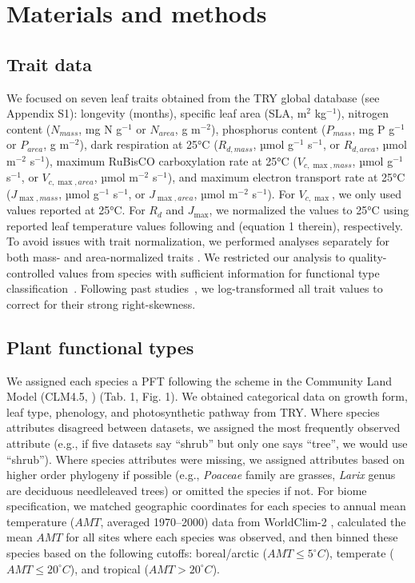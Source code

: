 \documentclass{article}
\begin{document}
\section{Materials and methods}

\subsection{Trait data}

We focused on seven leaf traits obtained from the TRY global database \citep{kattge_2011_try} (see Appendix S1):
longevity (months),
specific leaf area (SLA, m$^2$ kg$^{-1}$),
nitrogen content ($N_{mass}$, mg N g$^{-1}$ or $N_{area}$, g m$^{-2}$),
phosphorus content ($P_{mass}$, mg P g$^{-1}$ or $P_{area}$, g m$^{-2}$),
dark respiration at 25°C ($R_{d,mass}$, µmol g$^{-1}$ s$^{-1}$, or $R_{d,area}$, µmol m$^{-2}$ s$^{-1}$),
maximum RuBisCO carboxylation rate at 25°C ($V_{c,\max,mass}$, µmol g$^{-1}$ s$^{-1}$, or $V_{c,\max,area}$, µmol m$^{-2}$ s$^{-1}$),
and maximum electron transport rate at 25°C ($J_{\max,mass}$, µmol g$^{-1}$ s$^{-1}$, or $J_{\max,area}$, µmol m$^{-2}$ s$^{-1}$).
For $V_{c,\max}$, we only used values reported at 25°C.
For $R_{d}$ and $J_{\max}$, we normalized the values to 25°C using reported leaf temperature values following \citet{atkin_2015_global} and \citet{kattge_2007_temperature} (equation 1 therein), respectively.
To avoid issues with trait normalization, we performed analyses separately for both mass- and area-normalized traits \citep{osnas_2013_global,lloyd_2013_photosynthetically}.
We restricted our analysis to quality-controlled values from species with sufficient information for functional type classification~\cite[see][]{kattge_2011_try}.
Following past studies~\cite[e.g.][]{wright_2004_worldwide,onoda_2011_global,diaz_2015_global}, we log-transformed all trait values to correct for their strong right-skewness.

\subsection{Plant functional types}

We assigned each species a PFT following the scheme in the Community Land Model (CLM4.5, \citealt{clm45_note}) (Tab. 1, Fig. 1).
We obtained categorical data on growth form, leaf type, phenology, and photosynthetic pathway from TRY.
Where species attributes disagreed between datasets, we assigned the most frequently observed attribute (e.g., if five datasets say ``shrub'' but only one says ``tree'', we would use ``shrub'').
Where species attributes were missing, we assigned attributes based on higher order phylogeny if possible (e.g., \textit{Poaceae} family are grasses, \textit{Larix} genus are deciduous needleleaved trees) or omitted the species if not.
For biome specification, we matched geographic coordinates for each species to annual mean temperature ($AMT$, averaged 1970--2000) data from WorldClim-2 \citep{fick_2017_worldclim},
calculated the mean $AMT$ for all sites where each species was observed,
and then binned these species based on the following cutoffs: boreal/arctic ($AMT \leq 5^\circ C$), temperate ($AMT \leq 20^\circ C$), and tropical ($AMT > 20^\circ C$).
\end{document}

